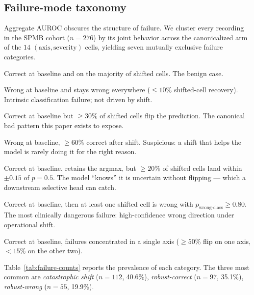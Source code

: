 \subsection{Failure-mode taxonomy}
\label{sec:failure-taxonomy}

Aggregate AUROC obscures the structure of failure. We cluster every recording in the SPMB cohort ($n{=}276$) by its joint behavior across the canonicalized arm of the $14$ $(\text{axis},\text{severity})$ cells, yielding seven mutually exclusive failure categories.

\begin{description}\setlength{\itemsep}{1pt}
  \item[Robust-correct.] Correct at baseline and on the majority of shifted cells. The benign case.
  \item[Robust-wrong.] Wrong at baseline and stays wrong everywhere ($\leq 10\%$ shifted-cell recovery). Intrinsic classification failure; not driven by shift.
  \item[Shift-induced flip.] Correct at baseline but $\geq 30\%$ of shifted cells flip the prediction. The canonical bad pattern this paper exists to expose.
  \item[Shift-recovered.] Wrong at baseline, $\geq 60\%$ correct after shift. Suspicious: a shift that helps the model is rarely doing it for the right reason.
  \item[Calibration collapse.] Correct at baseline, retains the argmax, but $\geq 20\%$ of shifted cells land within $\pm 0.15$ of $p{=}0.5$. The model ``knows'' it is uncertain without flipping --- which a downstream selective head can catch.
  \item[Catastrophic shift.] Correct at baseline, then at least one shifted cell is wrong with $p_{\text{wrong-class}}\!\geq\!0.80$. The most clinically dangerous failure: high-confidence wrong direction under operational shift.
  \item[Axis-specific.] Correct at baseline, failures concentrated in a single axis ($\geq 50\%$ flip on one axis, $<15\%$ on the other two).
\end{description}

Table~\ref{tab:failure-counts} reports the prevalence of each category. The three most common are \emph{catastrophic shift} ($n{=}112$, 40.6\%), \emph{robust-correct} ($n{=}97$, 35.1\%), \emph{robust-wrong} ($n{=}55$, 19.9\%).

